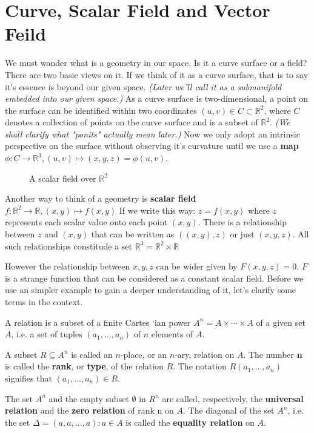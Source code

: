\section{Curve, Scalar Field and Vector Feild}

We must wander what is a geometry in our space. Is it a curve surface or a field? There are
two basic views on it. If we think of it as a curve surface, that is to say it's essence is beyond
our given space. \textit{(Later we'll call it as a submanifold embedded into our given space.)}
As a curve surface is two-dimensional, a point on the surface can be identified within two coordinates
$(u, v) \in C \subset \mathbb{R}^2$, where $C$ denotes a collection of points on the curve surface
and is a subset of $\mathbb{R}^2$. \textit{(We shall clarify what "ponits" actually mean later.)}
Now we only adopt an intrinsic perspective on the surface without observing it's curvature until we
use a \textbf{map} $\phi: C \to \mathbb{R}^3, (u,v) \mapsto (x,y,z)=\phi(u,v)$.

\begin{figure}[!ht]
    \centering
    
\end{figure}


\begin{figure}[!ht]
	\centering
    
    \caption{A scalar field over $\mathbb{R}^2$}
\end{figure}


Another way to think of a geometry is \textbf{scalar field} $f: \mathbb{R}^2 \to \mathbb{R}, (x,y) \mapsto f(x,y)$
If we write this way: $z=f(x,y)$ where $z$ represents each scalar value onto each point $(x,y)$.
There is a relationship between $z$ and $(x,y)$ that can be written as $((x,y),z)$ or just $(x,y,z)$.
All such relationships constitude a set $\mathbb{R}^3=\mathbb{R}^2 \times \mathbb{R}$

However the relationship between $x,y,z$ can be wider given by $F(x,y,z)=0$. $F$ is a strange function that
can be considered as a constant scalar field. Before we use an simpler example to gain a deeper understanding of it,
let's clarify some terms in the context.

\begin{definition}[Relation]
	\cite{1}
	A relation is a subset of a finite Cartes	`ian power $A^n=A\times\cdots\times A$ of a given set $A$,
	i.e. a set of tuples $(a_1,\dots,a_n)$ of $n$ elements of $A$.

	A subset $R\subseteq A^n$ is called an $n$-place, or an $n$-ary, relation on $A$.
	The number \textbf{n} is called the \textbf{rank}, or \textbf{type}, of the relation $R$.
	The notation $R(a_1,\dots,a_n)$ signifies that $(a_1,\dots,a_n)\in R$.

	The set $A^n$ and the empty subset $\emptyset$ in $R^n$ are called, respectively, the \textbf{universal relation} and the \textbf{zero relation} of rank n on $A$.
	The diagonal of the set $A^n$, i.e. the set $\Delta={(a,a,\dots,a):a\in A}$ is called the \textbf{equality relation} on $A$.

\end{definition}

